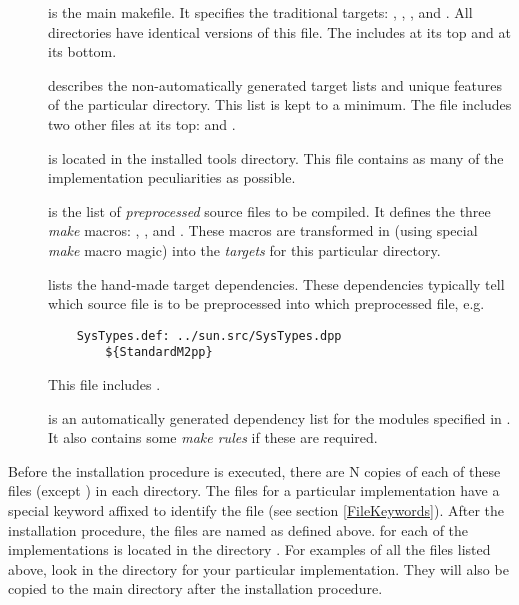 \begin{description}

\item[]
    is the main makefile.  It specifies the traditional targets:
    , , , and .
    All  directories have identical versions of this file.
    The  includes  at its top
    and  at its bottom.

\item[]
    describes the non-automatically generated target lists and
    unique features of the particular  directory.  This list is
    kept to a minimum.  The  file includes
    two other files at its top:  and .
    
\item[]
    is located in the installed tools directory.
    This file contains as many of the implementation peculiarities
    as possible.
    
\item[]
    is the list of {\em preprocessed} source files to be compiled.
    It defines the three {\em make} macros: , ,
    and .  These macros are transformed in 
    (using special {\em make} macro magic) into the {\em tar\-gets} for this 
    particular directory.
    
\item[]
    lists the hand-made target dependencies.  These dependencies
    typically tell which source file is to be preprocessed into which
    preprocessed file, e.g.
\begin{verbatim}
	SysTypes.def: ../sun.src/SysTypes.dpp
		${StandardM2pp}
\end{verbatim}
    This file includes .

\item[]
    is an automatically generated dependency list for the modules
    specified in .  It also contains some
    {\em make rules} if these are required.
\end{description}
\medskip

Before the installation procedure is executed, there are N copies of each 
of these files (except ) in each  directory.  
The files for a particular
implementation have a special keyword affixed to identify the
file (see section \ref{FileKeywords}).  After the installation
procedure, the files are named as defined above.  
for each of the implementations is located in the directory .
For examples of all the files listed above, look in the 
directory for your particular implementation.  They will also be
copied to the main  directory after the installation
procedure.



